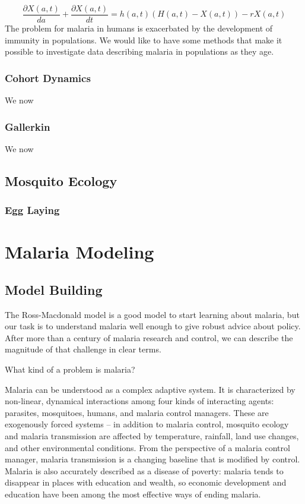 \documentclass[
]{book}
\begin{document}
\[
\frac{\partial X(a,t)}{da} + \frac{\partial X(a,t)}{dt} = h(a,t) \left(H(a,t) - X(a,t) \right) - r X(a,t)
\]
The problem for malaria in humans is exacerbated by the development of immunity in populations. We would like to have some methods that make it possible to investigate data describing malaria in populations as they age.

\section{Cohort Dynamics}\label{cohort-dynamics}

We now

\section{Gallerkin}\label{gallerkin}

We now

\chapter{Mosquito Ecology}\label{mosquito-ecology-2}

\section{Egg Laying}\label{egg-laying}

\part{Malaria Modeling}\label{part-malaria-modeling}

\chapter{Model Building}\label{model-building}

The Ross-Macdonald model is a good model to start learning about malaria, but our task is to understand malaria well enough to give robust advice about policy. After more than a century of malaria research and control, we can describe the magnitude of that challenge in clear terms.

What kind of a problem is malaria?

Malaria can be understood as a complex adaptive system. It is characterized by non-linear, dynamical interactions among four kinds of interacting agents: parasites, mosquitoes, humans, and malaria control managers. These are exogenously forced systems -- in addition to malaria control, mosquito ecology and malaria transmission are affected by temperature, rainfall, land use changes, and other environmental conditions. From the perspective of a malaria control manager, malaria transmission is a changing baseline that is modified by control. Malaria is also accurately described as a disease of poverty: malaria tends to disappear in places with education and wealth, so economic development and education have been among the most effective ways of ending malaria.
\end{document}

